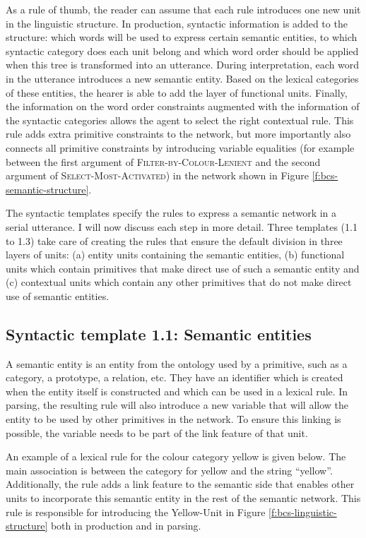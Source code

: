 As a rule of thumb, the reader can assume that each rule introduces
one new unit in the linguistic structure. In production, syntactic
information is added to the structure: which words will be used to
express certain semantic entities, to which syntactic category does
each unit belong and which word order should be applied when this tree
is transformed into an utterance. During interpretation, each word in
the utterance introduces a new semantic entity. Based on the lexical
categories of these entities, the hearer is able to add the layer of
functional units. Finally, the information on the word order
constraints augmented with the information of the syntactic categories
allows the agent to select the right contextual rule. This rule adds
extra primitive constraints to the network, but more importantly also
connects all primitive constraints by introducing variable equalities
(for example between the first argument of
\textsc{Filter-by-Colour-Lenient} and the second argument of
\textsc{Select-Most-Activated}) in the network shown in Figure
\ref{f:bcs-semantic-structure}.

The syntactic templates specify the rules to express a semantic
network in a serial utterance. I will now discuss each step in more
detail. Three templates (1.1 to 1.3) take care of creating the rules
that ensure the default division in three layers of units: (a) entity
units containing the semantic entities, (b) functional units which
contain primitives that make direct use of such a semantic entity and
(c) contextual units which contain any other primitives that do not
make direct use of semantic entities.

\subsection{Syntactic template 1.1: Semantic entities}

A semantic entity is an entity from the ontology used by a primitive,
such as a category, a prototype, a relation, etc. They have an
identifier which is created when the entity itself is constructed and
which can be used in a lexical rule. In parsing, the resulting rule
will also introduce a new variable that will allow the entity to be
used by other primitives in the network. To ensure this linking is
possible, the variable needs to be part of the link feature of that
unit.

An example of a lexical rule for the colour category yellow is given
below. The main association is between the category for yellow and the
string ``yellow''. Additionally, the rule adds a link feature to the
semantic side that enables other units to incorporate this semantic
entity in the rest of the semantic network. This rule is responsible
for introducing the Yellow-Unit in Figure
\ref{f:bcs-linguistic-structure} both in production and in parsing.

